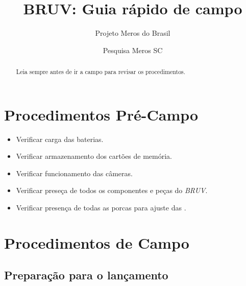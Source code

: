 \documentclass[
  12pt,
  letterpaper,
  DIV=11,
  numbers=noendperiod]{scrreprt}
\title{BRUV: Guia rápido de campo}
\subtitle{Projeto Meros do Brasil}
\author{Pesquisa Meros SC}
\date{}
\begin{document}
\maketitle
\begin{abstract}
Leia sempre antes de ir a campo para revisar os procedimentos.
\end{abstract}


\chapter{Procedimentos Pré-Campo}\label{procedimentos-pruxe9-campo}

\begin{itemize}
\item
  Verificar carga das baterias.
\item
  Verificar armazenamento dos cartões de memória.
\item
  Verificar funcionamento das câmeras.
\item
  Verificar preseça de todos os componentes e peças do \emph{BRUV}.
\item
  Verificar presença de todas as porcas para ajuste das .
\end{itemize}

\chapter{Procedimentos de Campo}\label{procedimentos-de-campo}

\section{Preparação para o
lançamento}\label{preparauxe7uxe3o-para-o-lanuxe7amento}
\end{document}
